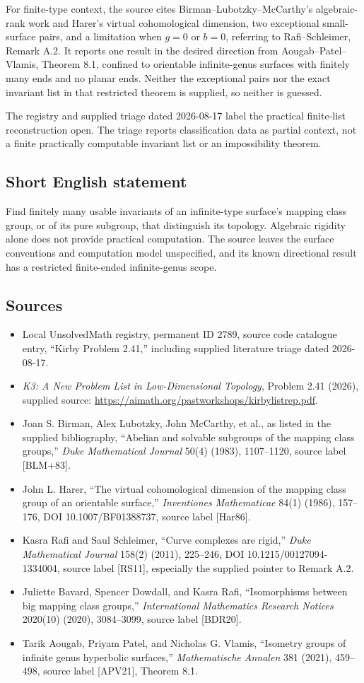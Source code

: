 \documentclass[11pt]{article}
\begin{document}
For finite-type context, the source cites Birman--Lubotzky--McCarthy's algebraic-rank work and Harer's virtual cohomological dimension, two exceptional small-surface pairs, and a limitation when \(g=0\) or \(b=0\), referring to Rafi--Schleimer, Remark A.2. It reports one result in the desired direction from Aougab--Patel--Vlamis, Theorem 8.1, confined to orientable infinite-genus surfaces with finitely many ends and no planar ends. Neither the exceptional pairs nor the exact invariant list in that restricted theorem is supplied, so neither is guessed.

The registry and supplied triage dated 2026-08-17 label the practical finite-list reconstruction open. The triage reports classification data as partial context, not a finite practically computable invariant list or an impossibility theorem.
\subsection{Short English statement}
Find finitely many usable invariants of an infinite-type surface's mapping class group, or of its pure subgroup, that distinguish its topology. Algebraic rigidity alone does not provide practical computation. The source leaves the surface conventions and computation model unspecified, and its known directional result has a restricted finite-ended infinite-genus scope.
\subsection{Sources}
\begin{itemize}
\item Local UnsolvedMath registry, permanent ID 2789, source code catalogue entry, ``Kirby Problem 2.41,'' including supplied literature triage dated 2026-08-17.
\item \emph{K3: A New Problem List in Low-Dimensional Topology}, Problem 2.41 (2026), supplied source: \url{https://aimath.org/pastworkshops/kirbylistrep.pdf}.
\item Joan S. Birman, Alex Lubotzky, John McCarthy, et al., as listed in the supplied bibliography, ``Abelian and solvable subgroups of the mapping class groups,'' \emph{Duke Mathematical Journal} 50(4) (1983), 1107--1120, source label [BLM+83].
\item John L. Harer, ``The virtual cohomological dimension of the mapping class group of an orientable surface,'' \emph{Inventiones Mathematicae} 84(1) (1986), 157--176, DOI 10.1007/BF01388737, source label [Har86].
\item Kasra Rafi and Saul Schleimer, ``Curve complexes are rigid,'' \emph{Duke Mathematical Journal} 158(2) (2011), 225--246, DOI 10.1215/00127094-1334004, source label [RS11], especially the supplied pointer to Remark A.2.
\item Juliette Bavard, Spencer Dowdall, and Kasra Rafi, ``Isomorphisms between big mapping class groups,'' \emph{International Mathematics Research Notices} 2020(10) (2020), 3084--3099, source label [BDR20].
\item Tarik Aougab, Priyam Patel, and Nicholas G. Vlamis, ``Isometry groups of infinite genus hyperbolic surfaces,'' \emph{Mathematische Annalen} 381 (2021), 459--498, source label [APV21], Theorem 8.1.
\end{itemize}
\end{document}
